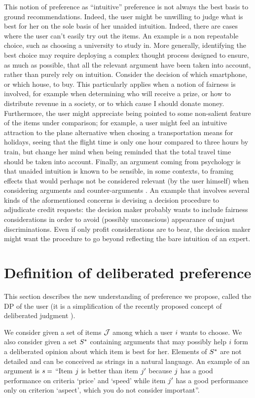 \documentclass[version=3.21, pagesize, twoside=off, bibliography=totoc, DIV=calc, fontsize=12pt, a4paper, french, english]{scrartcl}
\begin{document}
This notion of preference as “intuitive” preference is not always the best basis to ground recommendations. Indeed, the user might be unwilling to judge what is best for her on the sole basis of her unaided intuition. Indeed, there are cases where the user can’t easily try out the items. An example is a non repeatable choice, such as choosing a university to study in. 
More generally, identifying the best choice may require deploying a complex thought process designed to ensure, as much as possible, that all the relevant argument have been taken into account, rather than purely rely on intuition.
Consider the decision of which smartphone, or which house, to buy. 
This particularly applies when a notion of fairness is involved, for example when determining who will receive a prize, or how to distribute revenue in a society, or to which cause I should donate money.
Furthermore, the user might appreciate being pointed to some non-salient feature of the items under comparison; for example, a user might feel an intuitive attraction to the plane alternative when chosing a transportation means for holidays, seeing that the flight time is only one hour compared to three hours by train, but change her mind when being reminded that the total travel time should be taken into account. Finally, an argument coming from psychology is that unaided intuition is known to be sensible, in some contexts, to framing effects that would perhaps not be considered relevant (by the user himself) when considering arguments and counter-arguments \citep{kahneman_thinking_2013}. An example that involves several kinds of the aformentioned concerns is devising a decision procedure to adjudicate credit requests: the decision maker probably wants to include fairness considerations in order to avoid (possibly unconscious) appearance of unjust discriminations. Even if only profit considerations are to bear, the decision maker might want the procedure to go beyond reflecting the bare intuition of an expert.

\section{Definition of deliberated preference}
\label{sec:def}
This section describes the new understanding of preference we propose, called the \ac{DP} of the user (it is a simplification of the recently proposed concept of deliberated judgment \citep{cailloux_formal_2018}).

We consider given a set of items $\mathcal{J}$ among which a user $i$ wants to choose. We also consider given a set $S^*$ containing arguments that may possibly help $i$ form a deliberated opinion about which item is best for her. Elements of $S^*$ are not detailed and can be conceived as strings in a natural language. An example of an argument is $s = $ “Item $j$ is better than item $j'$ because $j$ has a good performance on criteria ‘price’ and ‘speed’ while item $j'$ has a good performance only on criterion ‘aspect’, which you do not consider important”.
\end{document}
